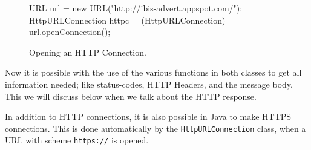 \begin{figure*}[ht] %
\begin{center}
\begin{code}
URL url = new URL("http://ibis-advert.appspot.com/");
HttpURLConnection httpc = (HttpURLConnection) url.openConnection();
\end{code}
\caption{Opening an HTTP Connection.\label{clientimpl-url}}
\end{center}
\end{figure*}

Now it is possible with the use of the various functions in both classes to get
all information needed; like status-codes, HTTP Headers, and the message body.
This we will discuss below when we talk about the HTTP response.

In addition to HTTP connections, it is also possible in Java to make HTTPS
connections. This is done automatically by the \texttt{HttpURLConnection}
class, when a URL with scheme \texttt{https://} is opened.

% 
% 
% 

